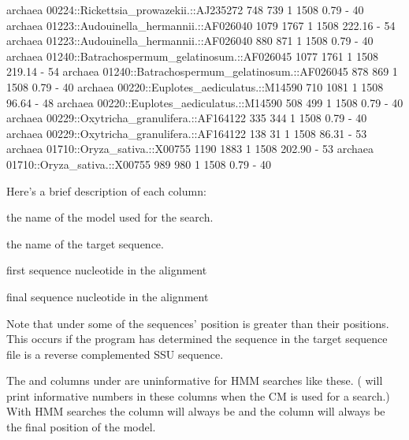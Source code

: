 \begin{sreoutputtiny}
  archaea     00224::Rickettsia_prowazekii.::AJ235272               748         739      1   1508      0.79         -   40
  archaea     01223::Audouinella_hermannii.::AF026040              1079        1767      1   1508    222.16         -   54
  archaea     01223::Audouinella_hermannii.::AF026040               880         871      1   1508      0.79         -   40
  archaea     01240::Batrachospermum_gelatinosum.::AF026045        1077        1761      1   1508    219.14         -   54
  archaea     01240::Batrachospermum_gelatinosum.::AF026045         878         869      1   1508      0.79         -   40
  archaea     00220::Euplotes_aediculatus.::M14590                  710        1081      1   1508     96.64         -   48
  archaea     00220::Euplotes_aediculatus.::M14590                  508         499      1   1508      0.79         -   40
  archaea     00229::Oxytricha_granulifera.::AF164122               335         344      1   1508      0.79         -   40
  archaea     00229::Oxytricha_granulifera.::AF164122               138          31      1   1508     86.31         -   53
  archaea     01710::Oryza_sativa.::X00755                         1190        1883      1   1508    202.90         -   53
  archaea     01710::Oryza_sativa.::X00755                          989         980      1   1508      0.79         -   40
\end{sreoutputtiny}

Here's a brief description of each column:

\begin{wideitem}
\item[\emprog{model name}] the name of the model used for the search.

\item[\emprog{target name}] the name of the target sequence.

\item[\emprog{start (target coord)}] first sequence nucleotide in the alignment

\item[\emprog{end (target coord)}] final sequence nucleotide in the alignment
\end{wideitem}

Note that under  some of the sequences'  position is
greater than their  positions. This occurs if the program
has determined the sequence in the target sequence file is a reverse
complemented SSU sequence. 

The  and  columns under  are
uninformative for HMM searches like these.
( will print informative numbers in
these columns when the CM is used for a search.) With HMM searches the
 column will always be  and the  column
will always be the final position of the model.


